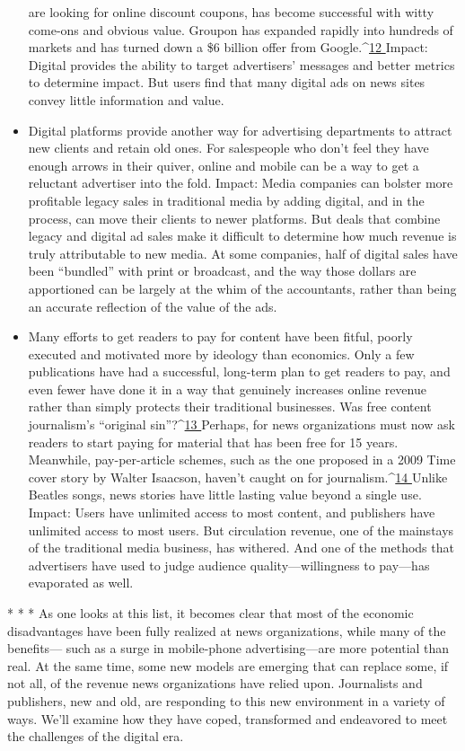 \begin{itemize}
are looking for online discount coupons, has become successful with witty
come-ons and obvious value. Groupon has expanded rapidly into hundreds
of markets and has turned down a \$6 billion offer from Google.^{\href{#endnotes-ch1}{12
}}Impact: Digital provides the ability to target advertisers’ messages and better
metrics to determine impact. But users find that many digital ads on news
sites convey little information and value.
\item Digital platforms provide another way for advertising departments to
attract new clients and retain old ones. For salespeople who don’t feel
they have enough arrows in their quiver, online and mobile can be a way to
get a reluctant advertiser into the fold.
Impact: Media companies can bolster more profitable legacy sales in traditional
media by adding digital, and in the process, can move their clients to
newer platforms. But deals that combine legacy and digital ad sales make it
difficult to determine how much revenue is truly attributable to new media.
At some companies, half of digital sales have been ``bundled'' with print or
broadcast, and the way those dollars are apportioned can be largely at the
whim of the accountants, rather than being an accurate reflection of the
value of the ads.
\item Many efforts to get readers to pay for content have been fitful, poorly
executed and motivated more by ideology than economics. Only a few
publications have had a successful, long-term plan to get readers to pay, and
even fewer have done it in a way that genuinely increases online revenue
rather than simply protects their traditional businesses. Was free content journalism’s
``original sin''?^{\href{#endnotes-ch1}{13 }}Perhaps, for news organizations must now ask readers
to start paying for material that has been free for 15 years. Meanwhile,
pay-per-article schemes, such as the one proposed in a 2009 Time cover
story by Walter Isaacson, haven’t caught on for journalism.^{\href{#endnotes-ch1}{14 }}Unlike Beatles
songs, news stories have little lasting value beyond a single use.
Impact: Users have unlimited access to most content, and publishers have
unlimited access to most users. But circulation revenue, one of the mainstays
of the traditional media business, has withered. And one of the methods that
advertisers have used to judge audience quality—willingness to pay—has
evaporated as well.
\end{itemize}
* * *
As one looks at this list, it becomes clear that most of the economic disadvantages
have been fully realized at news organizations, while many of the benefits—
such as a surge in mobile-phone advertising—are more potential than real. At the
same time, some new models are emerging that can replace some, if not all, of the
revenue news organizations have relied upon. Journalists and publishers, new and
old, are responding to this new environment in a variety of ways. We’ll examine
how they have coped, transformed and endeavored to meet the challenges of the
digital era.


